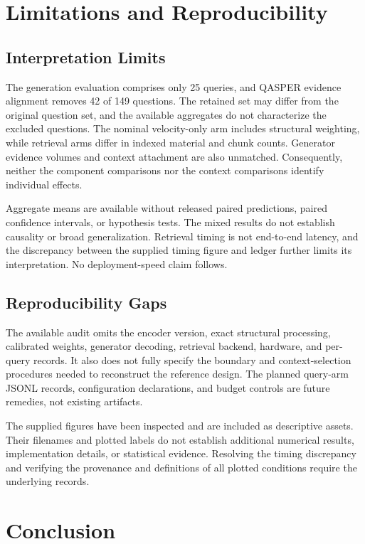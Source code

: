 \documentclass[10pt]{article}
\begin{document}
\section{Limitations and Reproducibility}

\subsection{Interpretation Limits}

The generation evaluation comprises only 25 queries, and QASPER evidence alignment removes 42 of 149 questions. The retained set may differ from the original question set, and the available aggregates do not characterize the excluded questions. The nominal velocity-only arm includes structural weighting, while retrieval arms differ in indexed material and chunk counts. Generator evidence volumes and context attachment are also unmatched. Consequently, neither the component comparisons nor the context comparisons identify individual effects.

Aggregate means are available without released paired predictions, paired confidence intervals, or hypothesis tests. The mixed results do not establish causality or broad generalization. Retrieval timing is not end-to-end latency, and the discrepancy between the supplied timing figure and ledger further limits its interpretation. No deployment-speed claim follows.

\subsection{Reproducibility Gaps}

The available audit omits the encoder version, exact structural processing, calibrated weights, generator decoding, retrieval backend, hardware, and per-query records. It also does not fully specify the boundary and context-selection procedures needed to reconstruct the reference design. The planned query-arm JSONL records, configuration declarations, and budget controls are future remedies, not existing artifacts.

The supplied figures have been inspected and are included as descriptive assets. Their filenames and plotted labels do not establish additional numerical results, implementation details, or statistical evidence. Resolving the timing discrepancy and verifying the provenance and definitions of all plotted conditions require the underlying records.

\clearpage
\section{Conclusion}
\end{document}
